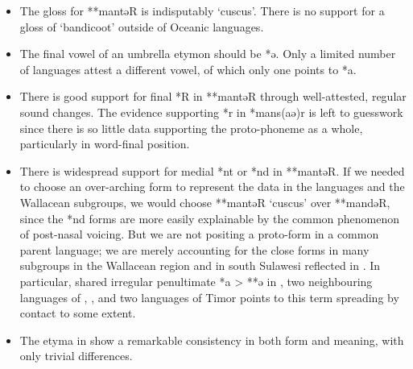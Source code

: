 \begin{itemize}
		\item	The gloss for **mantəR is indisputably ‘cuscus’.
					There is no support for a gloss of ‘bandicoot’ outside of Oceanic languages.
		\item	The final vowel of an umbrella etymon should be *ə.
					Only a limited number of  languages attest a
					different vowel, of which only one points to *a.
		\item	There is good support for final *R in **mantəR through
					well-attested, regular sound changes.
					The evidence supporting *r in *mans(aə)r is left to guesswork
					since there is so little data supporting the proto-phoneme as
					a whole, particularly in word-final position.
		\item	There is widespread support for medial *nt or *nd in **mantəR.
					If we needed to choose an over-arching form to represent the
					data in the  languages
					and the Wallacean subgroups,
					we would choose **mantəR ‘cuscus’ over **mandəR,
					since the *nd forms are more easily explainable by the common
					phenomenon of post-nasal voicing.
					But we are not positing a proto-form in a common parent language;
					we are merely accounting for the close forms in many subgroups
					in the Wallacean region
					and in south Sulawesi reflected in .
					In particular, shared irregular penultimate *a > **ə in ,
					two neighbouring languages of ,
					, and two languages of Timor points to this term spreading
					by contact to some extent.
		\item	The etyma in  show a remarkable consistency
					in both form and meaning, with only trivial differences.
\end{itemize}
